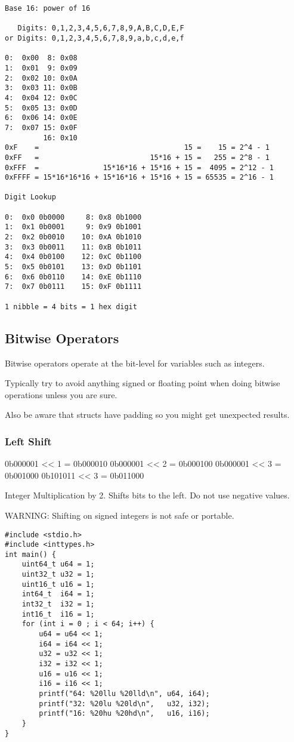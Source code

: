 \documentclass[11pt]{article}
\begin{document}
\begin{verbatim}
Base 16: power of 16

   Digits: 0,1,2,3,4,5,6,7,8,9,A,B,C,D,E,F
or Digits: 0,1,2,3,4,5,6,7,8,9,a,b,c,d,e,f

0:  0x00  8: 0x08
1:  0x01  9: 0x09   
2:  0x02 10: 0x0A  
3:  0x03 11: 0x0B   
4:  0x04 12: 0x0C  
5:  0x05 13: 0x0D  
6:  0x06 14: 0x0E           
7:  0x07 15: 0x0F  
         16: 0x10
0xF    =                                  15 =    15 = 2^4 - 1
0xFF   =                          15*16 + 15 =   255 = 2^8 - 1
0xFFF  =               15*16*16 + 15*16 + 15 =  4095 = 2^12 - 1
0xFFFF = 15*16*16*16 + 15*16*16 + 15*16 + 15 = 65535 = 2^16 - 1

Digit Lookup

0:  0x0 0b0000     8: 0x8 0b1000
1:  0x1 0b0001     9: 0x9 0b1001  
2:  0x2 0b0010    10: 0xA 0b1010 
3:  0x3 0b0011    11: 0xB 0b1011  
4:  0x4 0b0100    12: 0xC 0b1100 
5:  0x5 0b0101    13: 0xD 0b1101 
6:  0x6 0b0110    14: 0xE 0b1110          
7:  0x7 0b0111    15: 0xF 0b1111 

1 nibble = 4 bits = 1 hex digit
\end{verbatim}

\subsection{Bitwise Operators}
\label{sec:orgf2f5783}

Bitwise operators operate at the bit-level for variables such as integers.

Typically try to avoid anything signed or floating point when doing
bitwise operations unless you are sure.

Also be aware that structs have padding so you might get unexpected
results.

\subsubsection{Left Shift}
\label{sec:orgfda69d1}

0b000001 << 1 = 0b000010
0b000001 << 2 = 0b000100
0b000001 << 3 = 0b001000
0b101011 << 3 = 0b011000


Integer Multiplication by 2. Shifts bits to the left. Do not use negative values.

WARNING: Shifting on signed integers is not safe or portable.


\begin{verbatim}
#include <stdio.h>
#include <inttypes.h>
int main() {
    uint64_t u64 = 1;
    uint32_t u32 = 1;
    uint16_t u16 = 1;
    int64_t  i64 = 1;
    int32_t  i32 = 1;
    int16_t  i16 = 1;
    for (int i = 0 ; i < 64; i++) {
        u64 = u64 << 1;
        i64 = i64 << 1;
        u32 = u32 << 1;
        i32 = i32 << 1;
        u16 = u16 << 1;
        i16 = i16 << 1;
        printf("64: %20llu %20lld\n", u64, i64);
        printf("32: %20lu %20ld\n",   u32, i32);
        printf("16: %20hu %20hd\n",   u16, i16);
    }
}
\end{verbatim}
\end{document}
